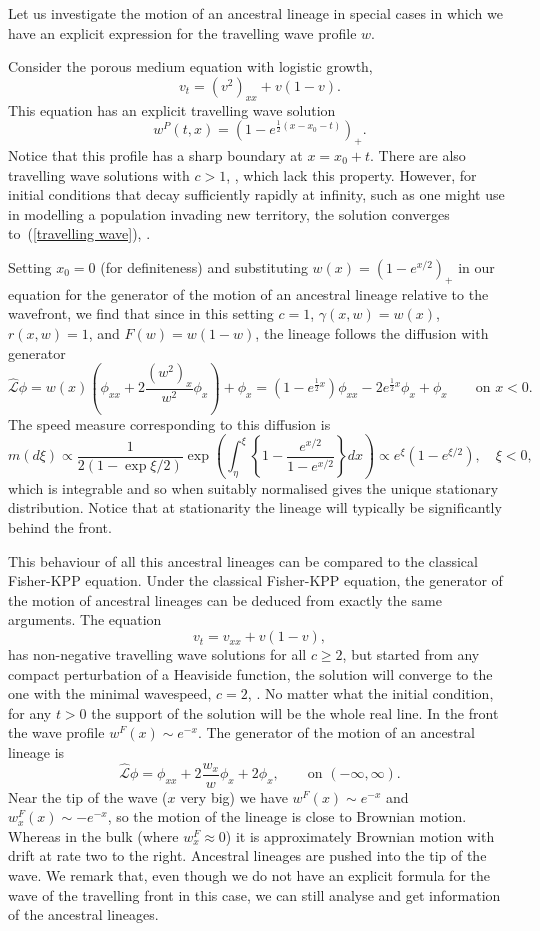 \documentclass[12pt]{article}
\def \hat{\widehat}
\newcommand{\plr}[1]{\todo[inline]{Peter: #1}}
\begin{document}
Let us investigate the motion of an ancestral lineage in special
cases in which we have an explicit expression for the travelling
wave profile $w$. 

\plr{PME:}
Consider the porous medium equation with logistic
growth,
\begin{equation}
\label{travelling wave}
v_t=(v^2)_{xx}+v(1-v).
\end{equation}
This equation has an explicit travelling wave solution
$$w^P(t,x)=\left(1-e^{\frac{1}{2}(x-x_0-t)}\right)_+.$$
Notice that this profile has a sharp boundary at $x=x_0+t$.
There are also travelling wave solutions with $c>1$,
\cite{gilding/kersner:2005}, which lack this property. However, for 
initial conditions that decay sufficiently rapidly at infinity,
such as one might use in modelling a population invading new territory,
the solution converges to~(\ref{travelling wave}), 
\cite{kamin/rosenau:2004}.

Setting $x_0=0$ (for definiteness) and substituting 
$w(x)=(1-e^{x/2})_+$ in our equation for the generator of the
motion of an ancestral
lineage relative to the wavefront, we find that since
in this setting $c=1$,
$\gamma(x,w)=w(x)$, $r(x,w)=1$, and $F(w)=w(1-w)$,
the lineage follows the diffusion with generator
$$\hat{\mathcal L}\phi=w(x)\left(\phi_{xx}+2\frac{(w^2)_x}{w^2}\phi_x\right)
+\phi_x
=\left(1-e^{\frac{1}{2}x}\right)\phi_{xx}-2e^{\frac{1}{2}x}\phi_x+
\phi_x\qquad\mbox{on }x<0.$$
The speed measure corresponding to this diffusion is 
$$m(d\xi)\propto\frac{1}{2(1-\exp{\xi/2})}
\exp\left(\int_\eta^\xi\left\{1-\frac{e^{x/2}}{1-e^{x/2}}\right\}dx\right)
\propto e^\xi\left(1-e^{\xi/2}\right),
\quad\mbox{$\xi<0$},$$
which is integrable and so when suitably normalised gives the unique
stationary distribution. Notice that at stationarity
the lineage will typically be 
significantly behind the front. 

\plr{FKPP:}
This behaviour of all this ancestral lineages can be compared to the classical
Fisher-KPP equation.
Under the classical Fisher-KPP equation, the generator of the motion
of ancestral lineages can be deduced from 
exactly the same arguments. 
The equation
$$v_t=v_{xx}+v(1-v),$$
has non-negative travelling wave solutions for all $c\geq 2$, 
but started from any compact perturbation of a Heaviside function, the 
solution will converge to the one with the minimal wavespeed, $c=2$,
\cite{kolmogorov/petrovsky/piscounov:1937, bramson:1983}.
No matter what the initial condition, for any $t>0$ the support of the 
solution will be the whole real line.  In the front the wave profile 
$w^F(x)\sim e^{-x}$.
The generator of the motion of an ancestral lineage is
$$\hat{\mathcal L}\phi=\phi_{xx}+2\frac{w_x}{w}\phi_x+2\phi_x,\qquad
\mbox{on }(-\infty,\infty).$$
Near the tip of the wave ($x$ very big) we have $w^F(x) \sim e^{-x}$ and $w_x^F(x) \sim -e^{-x}$, so
the motion of the lineage
is close to Brownian motion. Whereas in 
the bulk (where $w^F_x\approx 0$) it is approximately Brownian motion 
with drift at rate two to the right. Ancestral lineages are pushed into
the tip of the wave. 
We remark that, even though we do not have an explicit formula for the wave of the travelling front in this case, we can still analyse and get information of the ancestral lineages.
\end{document}
